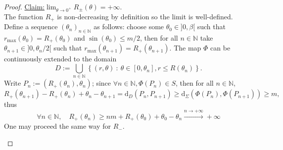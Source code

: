 \documentclass[a4paper,12pt]{article}
\def\NN{\mathbb N}
\def\d{\mathrm{d}}
\def\d{\mathrm{d}}
\newenvironment{claim}[1]{\par\noindent\underline{Claim:}\space#1}{}
\theoremstyle{definition}
\begin{document}
\begin{proof}
				\begin{claim}{$\lim_{\theta\rightarrow 0^+} R_\pm(\theta)= +\infty$.}
				\end{claim}\\
					The function $R_+$ is non-decreasing by definition so the limit is well-defined. Define a sequence $(\theta_n)_{n\in\NN}$ as follows: choose some $\theta_0\in]0,\beta[$ such that $r_{\max}(\theta_0)=R_+(\theta_0)$ and $\sin(\theta_0)\leq m/2$, then for all $n\in\NN$ take $\theta_{n+1}\in]0,\theta_{n}/2[$ such that $r_{\max}(\theta_{n+1})=R_+(\theta_{n+1})$. The map $\Phi$ can be continuously extended to the domain $$D:=\bigcup_{n\in\NN}\left\{(r,\theta)~:~\theta \in [0,\theta_n], r\leq R(\theta_n)\right\}.$$
					Write $P_n:=(R_+(\theta_n),\theta_n)$; since $\forall n\in\NN,\Phi(P_n)\in S$, then for all $n\in\NN$,
					$$R_+(\theta_{n+1})-R_+(\theta_n)+\theta_n-\theta_{n+1} =\d_D(P_n,P_{n+1})\geq \d_\Sigma(\Phi(P_n),\Phi(P_{n+1}))\geq m,$$ thus 
					$$\forall n\in\NN,\quad R_+(\theta_{n})\geq nm + R_+(\theta_0)+\theta_0-\theta_n\xrightarrow{n\rightarrow +\infty} +\infty$$
					One may proceed the same way for $R_-$.
									\def\sq{0.707106781}
				\def\myrad{6cm}%
				\def\deltarad{1cm}
				\def\deltatheta{7}%
				\def\thetamax{30}
						 \begin{center}
\end{center}
\end{proof}
\end{document}
